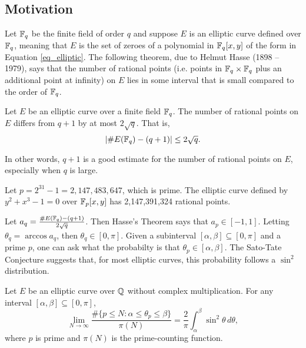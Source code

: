 
\subsection{Motivation}

Let $\mathbb{F}_q$ be the finite field of order $q$ and suppose $E$ is an elliptic curve defined over $\mathbb{F}_q$,
meaning that $E$ is the set of zeroes of a polynomial in $\mathbb{F}_q[x,y]$ of the form in Equation \ref{eq_elliptic}.
The following theorem, due to Helmut Hasse (1898 -- 1979), says that
the number of rational points (i.e. points in $\mathbb{F}_q \times \mathbb{F}_q$ plus an additional point at infinity) on $E$
lies in some interval that is small compared to the order of $\mathbb{F}_q$.
\begin{theorem}
  Let $E$ be an elliptic curve over a finite field $\mathbb{F}_q$.
  The number of rational points on $E$ differs from $q + 1$ by at most $2 \sqrt q$. That is,
  \[ | \#E(\mathbb{F}_q) - (q + 1) | \leq 2 \sqrt q. \]
\end{theorem}
In other words,
$q + 1$ is a good estimate for the number of rational points on $E$,
especially when $q$ is large.

\begin{example}
  Let $p = 2^{31} - 1 = 2,147,483,647$, which is prime.
  The elliptic curve defined by $y^2 + x^3 - 1 = 0$ over $\mathbb{F}_p[x,y]$ has 2,147,391,324 rational points.
\end{example}

Let $a_q = \frac {\#E(\mathbb{F}_q) - (q + 1)} {2\sqrt q}$.
Then Hasse's Theorem says that $a_p \in [-1, 1]$.
Letting $\theta_q = \arccos a_q$, then $\theta_q \in [0, \pi]$.
Given a subinterval $[\alpha, \beta] \subseteq [0, \pi]$ and a prime $p$,
one can ask what the probabilty is that $\theta_p \in [\alpha, \beta]$.
The Sato-Tate Conjecture suggests that, for most elliptic curves, this probability follows a $\sin^2$ distribution.

\begin{conjecture}
  Let $E$ be an elliptic curve over $\mathbb{Q}$ without complex multiplication.
  For any interval $[\alpha, \beta] \subseteq [0, \pi]$,
  \[ \lim_{N \to \infty}
    \frac {\#\{ p \leq N : \alpha \leq \theta_p \leq \beta \}} {\pi(N)} =
    \frac 2 \pi \int_{\alpha}^{\beta} \sin^2 \theta\,d\theta, \]
  where $p$ is prime and $\pi(N)$ is the prime-counting function.
\end{conjecture}

